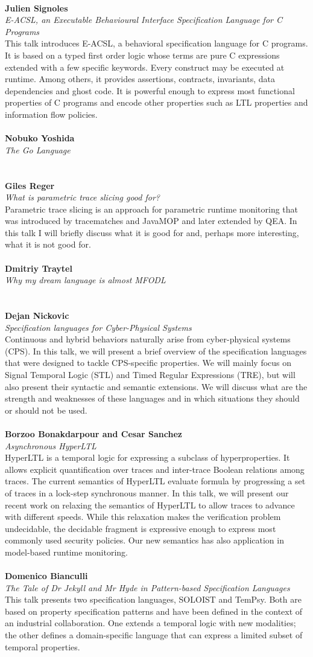 \documentclass{article}
\newcounter{talkc}
\newcommand{\talk}[3]{\stepcounter{talkc}
\vspace{0.5em}~\\
\noindent
\textbf{#1}\\ 
\noindent\emph{#2}\\ 
\noindent#3\\
}
\begin{document}
\talk{Julien Signoles}{E-ACSL, an Executable Behavioural Interface Specification Language for C Programs}{This talk introduces E-ACSL, a behavioral specification language for C programs. It is based on a typed first order logic whose terms are pure C expressions extended with a few specific keywords. Every construct may be executed at runtime. Among others, it provides assertions, contracts, invariants, data dependencies and ghost code. It is powerful enough to express most functional properties of C programs and encode other properties such as LTL properties and information flow policies.}
%
\talk{Nobuko Yoshida}{The Go Language}{}
%
\talk{Giles Reger}{What is parametric trace slicing good for?}{Parametric trace slicing is an approach for parametric runtime monitoring that was introduced by tracematches and JavaMOP and later extended by QEA. In this talk I will briefly discuss what it is good for and, perhaps more interesting, what it is not good for.}
%
\talk{Dmitriy Traytel}{Why my dream language is almost MFODL}{}
%
\talk{Dejan Nickovic}{ Specification languages for Cyber-Physical Systems}{Continuous and hybrid behaviors naturally arise from cyber-physical systems (CPS). In this talk, we will present a brief overview of the specification languages that were designed to tackle CPS-specific properties. We will mainly focus on Signal Temporal Logic (STL) and Timed Regular Expressions (TRE), but will also present their syntactic and semantic extensions. We will discuss what are the strength and weaknesses of these languages and in which situations they should or should not be used.}
%
%
\talk{Borzoo Bonakdarpour and Cesar Sanchez}{Asynchronous HyperLTL}{HyperLTL is a temporal logic for expressing a subclass of hyperproperties. It allows explicit quantification over traces and inter-trace Boolean relations among traces. The current semantics of HyperLTL evaluate formula by progressing a set of traces in a lock-step synchronous manner. In this talk, we will present our recent work on relaxing the semantics of HyperLTL to allow traces to advance with different speeds. While this relaxation makes the verification problem undecidable, the decidable fragment is expressive enough to express most commonly used security policies. Our new semantics has also application in model-based runtime monitoring.}
%
\talk{Domenico Bianculli}{The Tale of Dr Jekyll and Mr Hyde in Pattern-based Specification Languages}{This talk presents two specification languages, SOLOIST and TemPsy. Both are based on property specification patterns and have been defined in the context of an industrial collaboration. One extends a temporal logic with new modalities; the other defines a domain-specific language  that can express a limited subset of temporal properties.}
\end{document}

